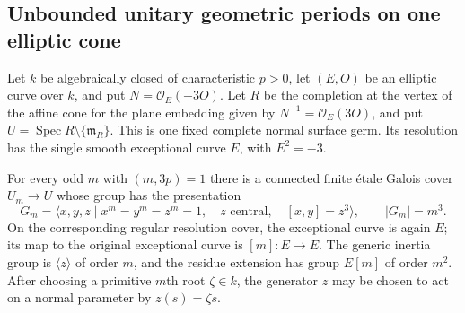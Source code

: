 \subsection{Unbounded unitary geometric periods on one elliptic cone}

\begin{lemma}
\label{D:elliptic-cone-Heisenberg-covers}
Let $k$ be algebraically closed of characteristic $p>0$, let
$(E,O)$ be an elliptic curve over $k$, and put
$N=\mathcal O_E(-3O)$. Let $R$ be the completion at the vertex
of the affine cone for the plane embedding given by
$N^{-1}=\mathcal O_E(3O)$, and put
$U=\operatorname{Spec}R\setminus\{\mathfrak m_R\}$.
This is one fixed complete normal surface germ. Its resolution
has the single smooth exceptional curve $E$, with $E^2=-3$.

For every odd $m$ with $(m,3p)=1$ there is a connected finite
\'etale Galois cover $U_m\to U$ whose group has the presentation
\[
 G_m=\langle x,y,z\mid x^m=y^m=z^m=1,\quad
 z\text{ central},\quad [x,y]=z^3\rangle,
 \qquad |G_m|=m^3.                                      \tag{D.EC.1}
\]
On the corresponding regular resolution cover, the exceptional
curve is again $E$; its map to the original exceptional curve is
$[m]:E\to E$. The generic inertia group is $\langle z\rangle$
of order $m$, and the residue extension has group $E[m]$ of
order $m^2$. After choosing a primitive $m$th root $\zeta\in k$,
the generator $z$ may be chosen to act on a normal parameter
by $z(s)=\zeta s$.
\end{lemma}

